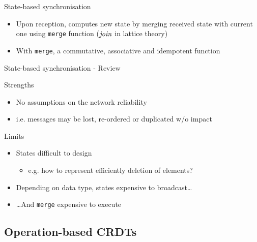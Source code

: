 \begin{frame}{State-based synchronisation}
    \begin{itemize}
        \item Upon reception, \alert{computes new state by merging received state with current one} using \texttt{merge} function  ($\mathit{join}$ in lattice theory)
        \item With \texttt{merge}, a \alert{commutative, associative and idempotent function}
    \end{itemize}
\end{frame}

\begin{frame}{State-based synchronisation - Review}

    \begin{block}{Strengths}
        \begin{itemize}
            \item No assumptions on the network reliability
            \item i.e. messages may be lost, re-ordered or duplicated w/o impact
        \end{itemize}
    \end{block}
    \pause
    \begin{block}{Limits}
        \begin{itemize}
            \item States difficult to design
            \begin{itemize}
                \item e.g. how to represent efficiently deletion of elements?
            \end{itemize}
            \pause
            \item Depending on data type, states expensive to broadcast\dots
            \item \dots And \texttt{merge} expensive to execute
        \end{itemize}
    \end{block}
\end{frame}

\subsection{Operation-based CRDTs}

